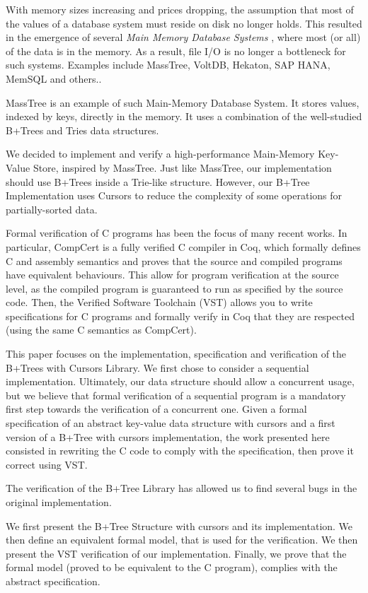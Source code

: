   With memory sizes increasing and prices dropping, the assumption that most of the values of a database system must reside on disk no longer holds.
  This resulted in the emergence of several \textit{Main Memory Database Systems} , where most (or all) of the data is in the memory.
  As a result, file I/O is no longer a bottleneck for such systems.
  Examples include MassTree, VoltDB, Hekaton, SAP HANA, MemSQL and others..

  MassTree is an example of such Main-Memory Database System.
  It stores values, indexed by keys, directly in the memory.
  It uses a combination of the well-studied  B+Trees and Tries data structures.

  We  decided to implement and verify a high-performance Main-Memory Key-Value Store, inspired by MassTree.
  Just like MassTree, our implementation should use B+Trees inside a Trie-like structure.
  However, our B+Tree Implementation uses Cursors to reduce the complexity of some operations for partially-sorted data.

  Formal verification of C programs has been the focus of many recent works.
  In particular, CompCert is a fully verified C compiler in Coq, which formally defines C and assembly semantics and proves that the source and compiled programs have equivalent behaviours.
  This allow for program verification at the source level, as the compiled program is guaranteed to run as specified by the source code.
  Then, the Verified Software Toolchain (VST)  allows you to write specifications for C programs and formally verify in Coq that they are respected (using the same C semantics as CompCert).

  This paper focuses on the implementation, specification and verification of the B+Trees with Cursors Library. We first chose to consider a sequential implementation.
  Ultimately, our data structure should allow a concurrent usage, but we believe that formal verification of a sequential program is a mandatory first step towards the verification of a concurrent one.
  Given a formal specification of an abstract key-value data structure with cursors and a first version of a B+Tree with cursors implementation, the work presented here consisted in rewriting the C code to comply with the specification, then prove it correct using VST.

  The verification of the B+Tree Library has allowed us to find several bugs in the original implementation.

  We first present the B+Tree Structure with cursors and its implementation.
  We then define an equivalent formal model, that is used for the verification.
  We then present the VST verification of our implementation.
  Finally, we prove that the formal model (proved to be equivalent to the C program), complies with the abstract specification.
